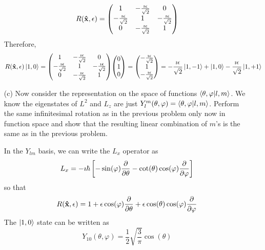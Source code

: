 \documentclass[a4paper,twoside]{article}
\begin{document}
\begin{itemize}
\begin{problem}
\begin{equation}
                R(\vu{x}, \epsilon) = \mqty(1 & -\frac{\imath \epsilon}{\sqrt{2}} & 0 \\ -\frac{\imath \epsilon}{\sqrt{2}} & 1 & -\frac{\imath \epsilon}{\sqrt{2}} \\ 0 & -\frac{\imath \epsilon}{\sqrt{2}} & 1)
            \end{equation}
            Therefore,
            \begin{equation}
                R(\vu{x}, \epsilon)\ket{1,0} = \mqty(1 & -\frac{\imath \epsilon}{\sqrt{2}} & 0 \\ -\frac{\imath \epsilon}{\sqrt{2}} & 1 & -\frac{\imath \epsilon}{\sqrt{2}} \\ 0 & -\frac{\imath \epsilon}{\sqrt{2}} & 1) \mqty(0\\1\\0) = \mqty(- \frac{\imath \epsilon}{\sqrt{2}} \\ 1 \\ - \frac{\imath \epsilon}{\sqrt{2}}) = - \frac{\imath \epsilon}{\sqrt{2}}\ket{1,-1} +\ket{1,0} - \frac{\imath \epsilon}{\sqrt{2}}\ket{1,+1}
            \end{equation}
        \end{problem}
    \item[(c)] Now consider the representation on the space of functions $\bra{\theta, \varphi}\ket{l,m} $. We know the eigenstates of $ L^2 $ and $ L_z $ are just $ Y_l^m(\theta, \varphi) =\bra{\theta, \varphi}\ket{l,m} $. Perform the same infinitesimal rotation as in the previous problem only now in function space and show that the resulting linear combination of $ m $'s is the same as in the previous problem.
        \begin{problem}
            In the $ Y_{lm} $ basis, we can write the $ L_x $ operator as
            \begin{equation}
                L_x = - \imath \hbar \left[ - \sin(\varphi) \pdv{\theta} - \cot(\theta) \cos(\varphi) \pdv{\varphi} \right]
            \end{equation}
            so that
            \begin{equation}
                R(\vu{x}, \epsilon) = 1 + \epsilon \cos(\varphi) \pdv{\theta} + \epsilon \cos(\theta) \cos(\varphi) \pdv{\varphi}
            \end{equation}
            The $\ket{1,0}$ state can be written as
            \begin{equation}
                Y_{10}(\theta, \varphi) = \frac{1}{2} \sqrt{\frac{3}{\pi}} \cos(\theta)
            \end{equation}

\end{problem}
\end{itemize}
\end{document}
